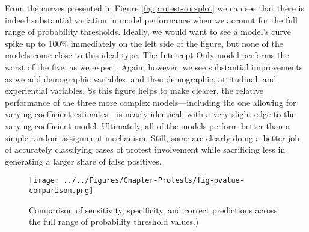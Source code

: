 			From the curves presented in Figure \ref{fig:protest-roc-plot} we can see that there is indeed substantial variation in model performance when we account for the full range of probability thresholds. Ideally, we would want to see a model's curve spike up to 100\% immediately on the left side of the figure, but none of the models come close to this ideal type. The Intercept Only model performs the worst of the five, as we expect. Again, however, we see substantial improvements as we add demographic variables, and then demographic, attitudinal, and experiential variables. Ss this figure helps to make clearer, the relative performance of the three more complex models---including the one allowing for varying coefficient estimates---is nearly identical, with a very slight edge to the varying coefficient model. Ultimately, all of the models perform better than a simple random assignment mechanism. Still, some are clearly doing a better job of accurately classifying cases of protest involvement while sacrificing less in generating a larger share of false positives.
			
			\begin{figure}[t]
				\centering\texttt{[image: ../../Figures/Chapter-Protests/fig-pvalue-comparison.png]}
				\caption{Comparison of sensitivity, specificity, and correct predictions across the full range of probability threshold values.)}
				\label{fig:protest-pvalue-compare}
			\end{figure}
			

